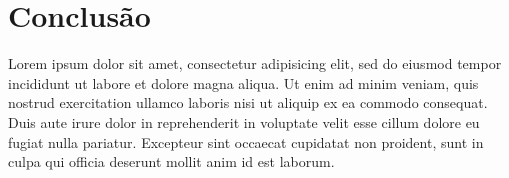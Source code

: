 \documentclass[
    12pt,               %
    openright,          %
    twoside,            %
    a4paper,            %
    chapter=TITLE,     %
    english,            %
    spanish,            %
    portuguese              %
    ]{abntex2}
\begin{document}
\chapter{Conclusão}

Lorem ipsum dolor sit amet, consectetur adipisicing elit, sed do eiusmod tempor incididunt ut labore et dolore magna aliqua. Ut enim ad minim veniam, quis nostrud exercitation ullamco laboris nisi ut aliquip ex ea commodo consequat. Duis aute irure dolor in reprehenderit in voluptate velit esse cillum dolore eu fugiat nulla pariatur. Excepteur sint occaecat cupidatat non proident, sunt in culpa qui officia deserunt mollit anim id est laborum.



\postextual





%
%








\printindex
\end{document}
